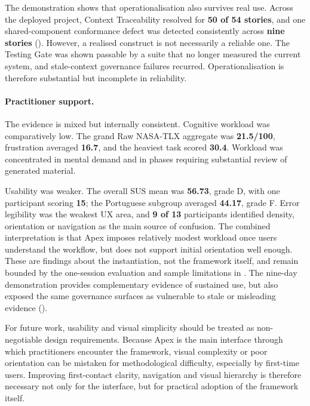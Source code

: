 The demonstration shows that operationalisation also survives real use. Across the deployed project, Context Traceability resolved for \textbf{50 of 54 stories}, and one shared-component conformance defect was detected consistently across \textbf{nine stories} (). However, a realised construct is not necessarily a reliable one. The Testing Gate was shown passable by a suite that no longer measured the current system, and stale-context governance failures recurred. Operationalisation is therefore substantial but incomplete in reliability.

\paragraph{Practitioner support.}
The evidence is mixed but internally consistent. Cognitive workload was comparatively low. The grand Raw \ac{NASA-TLX} aggregate was \textbf{21.5/100}, frustration averaged \textbf{16.7}, and the heaviest task scored \textbf{30.4}. Workload was concentrated in mental demand and in phases requiring substantial review of generated material.

Usability was weaker. The overall \ac{SUS} mean was \textbf{56.73}, grade D, with one participant scoring \textbf{15}; the Portuguese subgroup averaged \textbf{44.17}, grade F. Error legibility was the weakest \ac{UX} area, and \textbf{9 of 13} participants identified density, orientation or navigation as the main source of confusion. The combined interpretation is that Apex imposes relatively modest workload once users understand the workflow, but does not support initial orientation well enough. These are findings about the instantiation, not the framework itself, and remain bounded by the one-session evaluation and sample limitations in . The nine-day demonstration provides complementary evidence of sustained use, but also exposed the same governance surfaces as vulnerable to stale or misleading evidence ().

For future work, usability and visual simplicity should be treated as non-negotiable design requirements. Because Apex is the main interface through which practitioners encounter the framework, visual complexity or poor orientation can be mistaken for methodological difficulty, especially by first-time users. Improving first-contact clarity, navigation and visual hierarchy is therefore necessary not only for the interface, but for practical adoption of the framework itself.